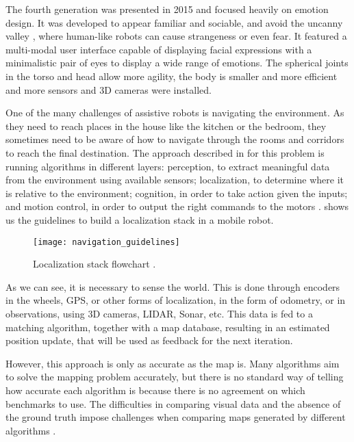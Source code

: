 The fourth generation was presented in 2015 and focused heavily on emotion design. It was developed to appear familiar and sociable, and avoid the uncanny valley \cite{macdorman2006subjective}, where human-like robots can cause strangeness or even fear. It featured a multi-modal user interface capable of displaying facial expressions with a minimalistic pair of eyes to display a wide range of emotions. The spherical joints in the torso and head allow more agility, the body is smaller and more efficient and more sensors and 3D cameras were installed.

One of the many challenges of assistive robots is navigating the environment. As they need to reach places in the house like the kitchen or the bedroom, they sometimes need to be aware of how to navigate through the rooms and corridors to reach the final destination. The approach described in \citeauthor{siegwart2011introduction} for this problem is running algorithms in different layers: perception, to extract meaningful data from the environment using available sensors; localization, to determine where it is relative to the environment; cognition, in order to take action given the inputs; and motion control, in order to output the right commands to the motors \cite{siegwart2011introduction}.  shows us the guidelines to build a localization stack in a mobile robot.

\begin{figure}[!ht]
    \centering
    \texttt{[image: navigation\_guidelines]}
    \caption{Localization stack flowchart \cite{siegwart2011introduction}.}
    \label{fig:navigation_guidelines}
\end{figure}

As we can see, it is necessary to sense the world. This is done through encoders in the wheels, GPS, or other forms of localization, in the form of odometry, or in observations, using 3D cameras, LIDAR, Sonar, etc. This data is fed to a matching algorithm, together with a map database, resulting in an estimated position update, that will be used as feedback for the next iteration.

However, this approach is only as accurate as the map is. Many algorithms aim to solve the mapping problem accurately, but there is no standard way of telling how accurate each algorithm is because there is no agreement on which benchmarks to use. The difficulties in comparing visual data and the absence of the ground truth impose challenges when comparing maps generated by different algorithms \cite{amigoni2007good}.

